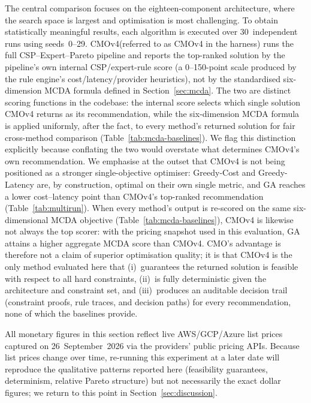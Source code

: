 \documentclass[journal]{IEEEtran}
\newcommand{\cmo}{CMO\xspace}
\newcommand{\cmofour}{CMOv4\xspace}
\begin{document}
The central comparison focuses on the eighteen-component architecture, where the
search space is largest and optimisation is most challenging. To obtain
statistically meaningful results, each algorithm is executed over 30~independent
runs using seeds~0--29. \cmofour (referred to as CMOv4 in the harness) runs the
full CSP--Expert--Pareto pipeline and reports the top-ranked solution by the
pipeline's own internal CSP/expert-rule score (a 0--150-point scale produced
by the rule engine's cost/latency/provider heuristics), not by the
standardised six-dimension MCDA formula defined in Section~\ref{sec:mcda}.
The two are distinct scoring functions in the codebase: the internal score
selects which single solution \cmofour returns as its recommendation, while
the six-dimension MCDA formula is applied uniformly, after the fact, to every
method's returned solution for fair cross-method comparison
(Table~\ref{tab:mcda-baselines}). We flag this distinction explicitly because
conflating the two would overstate what determines \cmofour's own
recommendation. We emphasise at the outset that \cmofour is not being
positioned as a
stronger single-objective optimiser: Greedy-Cost and Greedy-Latency are, by
construction, optimal on their own single metric, and GA reaches a lower
cost--latency point than \cmofour's top-ranked recommendation
(Table~\ref{tab:multirun}). When every method's output is re-scored on the same
six-dimensional MCDA objective (Table~\ref{tab:mcda-baselines}), \cmofour is
likewise not always the top scorer: with the pricing snapshot used in this
evaluation, GA attains a higher aggregate MCDA score than \cmofour. \cmo's
advantage is therefore not a claim of superior optimisation quality; it is
that \cmofour is the only method evaluated here that (i)~guarantees the
returned solution is feasible with respect to all hard constraints, (ii)~is
fully deterministic given the architecture and constraint set, and
(iii)~produces an auditable decision trail (constraint proofs, rule traces,
and decision paths) for every recommendation, none of which the baselines
provide.

All monetary figures in this section reflect live AWS/GCP/Azure list prices
captured on 26~September~2026 via the providers' public pricing APIs. Because
list prices change over time, re-running this experiment at a later date will
reproduce the qualitative patterns reported here (feasibility guarantees,
determinism, relative Pareto structure) but not necessarily the exact dollar
figures; we return to this point in Section~\ref{sec:discussion}.
\end{document}
